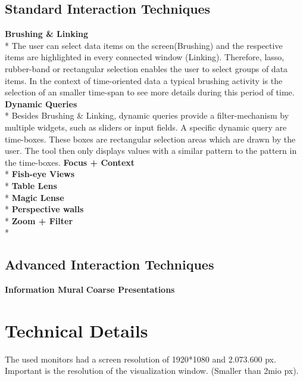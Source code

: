 \subsection{Standard Interaction Techniques}
\textbf{Brushing \& Linking}\\*
The user can select data items on the screen(Brushing) and the respective items are highlighted in every connected window (Linking). Therefore, lasso, rubber-band or rectangular selection enables the user to select groups of data items\cite{Tegarden1999a, Aigner2011}. In the context of time-oriented data a typical brushing activity is the selection of an smaller time-span to see more details during this period of time.
\textbf{Dynamic Queries}\\*
Besides Brushing \& Linking, dynamic queries provide a filter-mechanism by multiple widgets, such as sliders or input fields\cite{Hochheiser2004,Shneiderman2008,Aigner2011}. A specific dynamic query are time-boxes. These boxes are rectangular selection areas which are drawn by the user. The tool then only displays values with a similar pattern to the pattern in the time-boxes.
\textbf{Focus + Context}\\*
\textbf{Fish-eye Views}\\*
\textbf{Table Lens}\\*
\textbf{Magic Lense}\\*
\textbf{Perspective walls\cite{Keim2005}}\\*
\textbf{Zoom + Filter}\\*



\subsection{Advanced Interaction Techniques}
\textbf{Information Mural}
\textbf{Coarse Presentations}



\section{Technical Details}
The used monitors had a screen resolution of 1920*1080 and  2.073.600 px.  
Important is the resolution of the visualization window. (Smaller than 2mio px).
